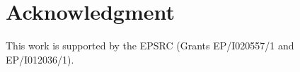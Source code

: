\documentclass[conference]{IEEEtran}
\begin{document}


\section*{Acknowledgment}
This work is supported by the EPSRC (Grants EP/I020557/1 and EP/I012036/1).



%


\end{document}
